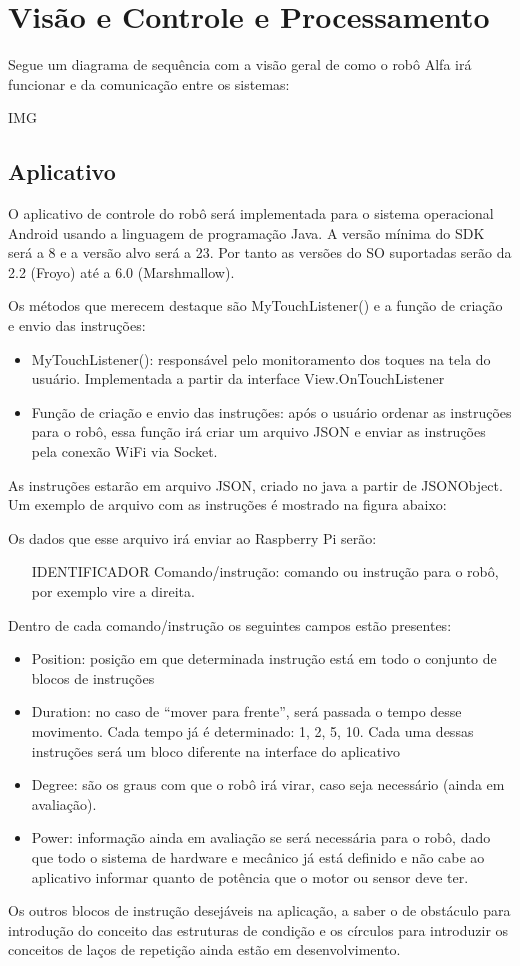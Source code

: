 \section{Visão e Controle e Processamento}

Segue um diagrama de sequência com a visão geral de como o robô Alfa irá funcionar e da comunicação entre os sistemas:

IMG

\subsection{Aplicativo}
O aplicativo de controle do robô será implementada para o sistema operacional Android usando a linguagem de programação Java. A versão mínima do SDK será a 8 e a versão alvo será a 23. Por tanto as versões do SO suportadas serão da 2.2 (Froyo) até a 6.0 (Marshmallow).

Os métodos que merecem destaque são MyTouchListener() e a função de criação e envio das instruções:
\begin{itemize}
\item MyTouchListener(): responsável pelo monitoramento dos toques na tela do usuário. Implementada a partir da interface View.OnTouchListener
\item Função de criação e envio das instruções: após o usuário ordenar as instruções para o robô, essa função irá criar um arquivo JSON e enviar as instruções pela conexão WiFi via Socket.
\end{itemize}

As instruções estarão em arquivo JSON, criado no java a partir de JSONObject. Um exemplo de arquivo com as instruções é mostrado na figura abaixo:

Os dados que esse arquivo irá enviar ao Raspberry Pi serão:
\begin{itemize}
\item [IDENTIFICADOR] Comando/instrução: comando ou instrução para o robô, por exemplo vire a direita.
\end{itemize}

Dentro de cada comando/instrução os seguintes campos estão presentes:
\begin{itemize}
\item Position: posição em que determinada instrução está em todo o conjunto de blocos de instruções
\item Duration: no caso de “mover para frente”, será passada o tempo desse movimento. Cada tempo já é determinado: 1, 2, 5, 10. Cada uma dessas instruções será um bloco diferente na interface do aplicativo
\item Degree: são os graus com que o robô irá virar, caso seja necessário (ainda em avaliação).
\item Power: informação ainda em avaliação se será necessária para o robô, dado que todo o sistema de hardware e mecânico já está definido e não cabe ao aplicativo informar quanto de potência que o motor ou sensor deve ter.
\end{itemize}

Os outros blocos de instrução desejáveis na aplicação, a saber o de obstáculo para introdução do conceito das estruturas de condição e os círculos para introduzir os conceitos de laços de repetição ainda estão em desenvolvimento.